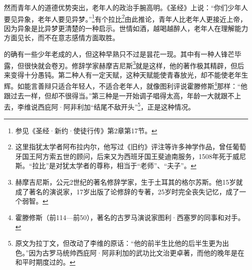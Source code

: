 \par 然而青年人的道德优势突出，老年人的政治手腕高明。《圣经》上说：“你们少年人要见异象，老年人要见异梦。”\footnote{参见《圣经·新约·使徒行传》第2章第17节。}有个拉比\footnote{这里指犹太学者阿布拉内尔，他写过《旧约》评注等许多神学作品，曾任葡萄牙国王阿方索五世的顾问，后来又为西班牙国王斐迪南服务，1508年死于威尼斯。“拉比”是对犹太学者的尊称，相当于“老师”、“夫子”。}由此推论，青年人比老年人更接近上帝，因为异象是比异梦更清楚的一种启示。世情如酒，越喝越醉人，老年人在理解能力方面见长，而不在意志感情方面取胜。
\par 的确有一些少年老成的人，但这种早熟只不过是昙花一现。其中有一种人锋芒毕露，但很快就会卷刃。修辞学家赫摩吉尼斯\footnote{赫摩吉尼斯，公元2世纪的著名修辞学家，生于土耳其的格尔苏斯。他15岁就成了著名的演说家，17岁出版了论修辞的专著，25岁时完全丧失记忆，成了一个弱智。}就是这样，他的著作极其精辟，但后来变得十分愚钝。第二种人有一定天赋，这种天赋能使青春放光，却不能使老年生辉。如能言善辩只适合年轻人，不适合老年人，就像图利评说霍滕修斯\footnote{霍滕修斯（前114—前50），著名的古罗马演说家图利·西塞罗的同事和对手。}那样：“他跟过去一样，但却不很得当。”第三种是一开始调子唱得太高，年龄一大就跟不上去，李维说西庇阿·阿非利加“结尾不敌开头”\footnote{原文为拉丁文，但改动了李维的原话：“他的前半生比他的后半生更为出色。”因为古罗马统帅西庇阿·阿非利加的武功比文治更卓著，而他的晚年是在和平时期度过的。}，正是这种情况。




